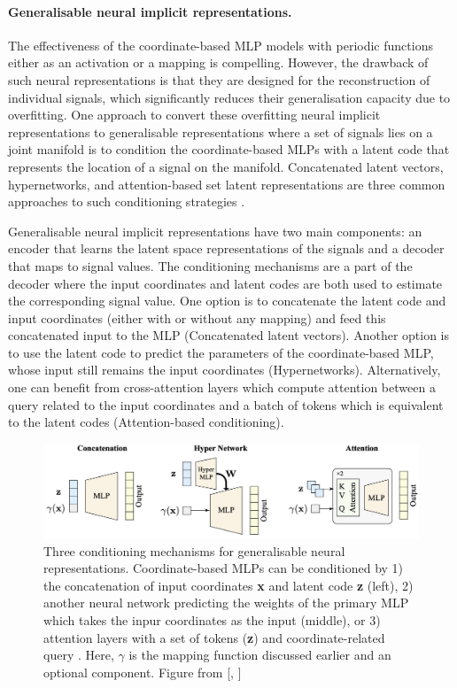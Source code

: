 \paragraph{Generalisable neural implicit representations.}
The effectiveness of the coordinate-based MLP models with periodic functions either as an activation or a mapping is compelling. However, the drawback of such neural representations is that they are designed for the reconstruction of individual signals, which significantly reduces their generalisation capacity due to overfitting. One approach to convert these overfitting neural implicit representations to generalisable representations where a set of signals lies on a joint manifold is to condition the coordinate-based MLPs with a latent code that represents the location of a signal on the manifold. Concatenated latent vectors, hypernetworks, and attention-based set latent representations are three common approaches to such conditioning strategies \cite{rebain2022attention}.

Generalisable neural implicit representations have two main components: an encoder that learns the latent space representations of the signals and a decoder that maps to signal values. The conditioning mechanisms are a part of the decoder where the input coordinates and latent codes are both used to estimate the corresponding signal value. One option is to concatenate the latent code and input coordinates (either with or without any mapping) and feed this concatenated input to the MLP (Concatenated latent vectors). Another option is to use the latent code to predict the parameters of the coordinate-based MLP, whose input still remains the input coordinates (Hypernetworks). Alternatively, one can benefit from cross-attention layers which compute attention between a query related to the input coordinates and a batch of tokens which is equivalent to the latent codes (Attention-based conditioning). 


\begin{figure}[ht]
  \centering
   \includegraphics[width=\linewidth]{Images/conditioning-mechs.png}
   \caption{Three conditioning mechanisms for generalisable neural representations. Coordinate-based MLPs can be conditioned by 1) the concatenation of input coordinates \textbf{x} and latent code \textbf{z} (left), 2) another neural network predicting the weights of the primary MLP which takes the inpur coordinates as the input (middle), or 3) attention layers with a set of tokens (\textbf{z}) and coordinate-related query . Here, $\gamma$ is the mapping function discussed earlier and an optional component. Figure from [\citeauthor{rebain2022attention}, \citeyear{rebain2022attention}]}
   \label{fig:ffn}
\end{figure}


